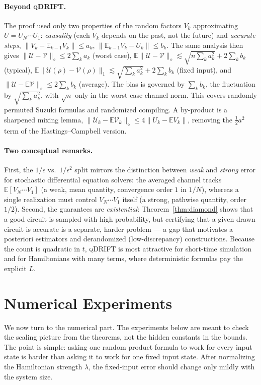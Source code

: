 ﻿\documentclass[12pt]{article}
\theoremstyle{plain}
\theoremstyle{definition}
\newcommand{\norm}[1]{\lVert #1 \rVert}
\newcommand{\dnorm}[1]{\lVert #1 \rVert_{\diamond}}
\newcommand{\tnorm}[1]{\lVert #1 \rVert_{1}}
\newcommand{\E}{\mathbb{E}}
\newcommand{\Uchan}{\mathcal{U}}
\newcommand{\Vchan}{\mathcal{V}}
\begin{document}
	\paragraph{Beyond \textsc{qDRIFT}.}
	The proof used only two properties of the random factors $V_k$ approximating $U=U_N\cdots U_1$:
	\emph{causality} (each $V_k$ depends on the past, not the future) and \emph{accurate steps},
	$\norm{V_k-\E_{k-1}V_k}\le a_k$, $\norm{\E_{k-1}V_k-U_k}\le b_k$. The same analysis then gives
	$\dnorm{\Uchan-\Vchan}\le2\sum_k a_k$ (worst case),
	$\E\dnorm{\Uchan-\Vchan}\lesssim\sqrt{n\sum_k a_k^2}+2\sum_k b_k$ (typical),
	$\E\tnorm{\Uchan(\rho)-\Vchan(\rho)}\lesssim\sqrt{\sum_k a_k^2}+2\sum_k b_k$ (fixed input), and
	$\dnorm{\Uchan-\E\Vchan}\le2\sum_k b_k$ (average). The bias is governed by $\sum_k b_k$, the
	fluctuation by $\sqrt{\sum_k a_k^2}$, with $\sqrt n$ only in the worst-case channel norm. This
	covers randomly permuted Suzuki formulas and randomized compiling. A by-product is a sharpened
	mixing lemma, $\dnorm{\Uchan_k-\E\Vchan_k}\le4\norm{U_k-\E V_k}$, removing the $\tfrac12a^2$
	term of the Hastings--Campbell version.
	
	\paragraph{Two conceptual remarks.}
	First, the $1/\epsilon$ vs.\ $1/\epsilon^2$ split mirrors the distinction between
	\emph{weak} and \emph{strong} error for stochastic differential equation solvers: the
	averaged channel tracks $\E[V_N\cdots V_1]$ (a weak, mean quantity, convergence order $1$ in
	$1/N$), whereas a single realization must control $V_N\cdots V_1$ itself (a strong, pathwise
	quantity, order $1/2$). Second, the guarantees are \emph{existential}: Theorem~\ref{thm:diamond}
	shows that a good circuit is sampled with high probability, but certifying that a given drawn
	circuit is accurate is a separate, harder problem --- a gap that motivates a posteriori
	estimators and derandomized (low-discrepancy) constructions. Because the count is quadratic in
	$t$, \textsc{qDRIFT} is most attractive for short-time simulation and for Hamiltonians with
	many terms, where deterministic formulas pay the explicit $L$.

	\section{Numerical Experiments}\label{sec:experiments}

	We now turn to the numerical part. The experiments below are meant to check the scaling picture from the theorems, not the hidden constants in the bounds. The point is simple: asking one random product formula to work for every input state is harder than asking it to work for one fixed input state. After normalizing the Hamiltonian strength $\lambda$, the fixed-input error should change only mildly with the system size.
\end{document}
